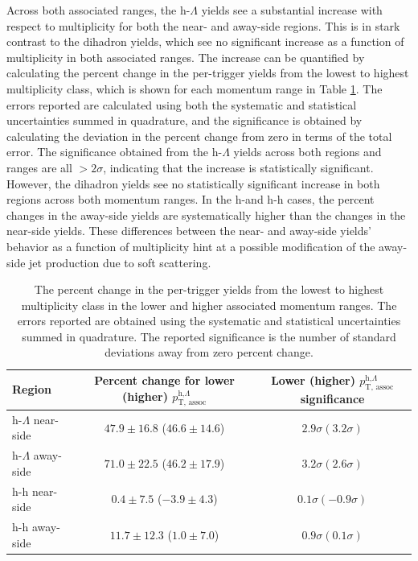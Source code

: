 Across both associated \pt ranges, the h-$\Lambda$ yields see a substantial increase with respect to multiplicity for both the near- and away-side regions. This is in stark contrast to the dihadron yields, which see no significant increase as a function of multiplicity in both associated \pt ranges. The increase can be quantified by calculating the percent change in the per-trigger yields from the lowest to highest multiplicity class, which is shown for each momentum range in Table \ref{tab:percent_increase}. The errors reported are calculated using both the systematic and statistical uncertainties summed in quadrature, and the significance is obtained by calculating the deviation in the percent change from zero in terms of the total error. The significance obtained from the h-$\Lambda$ yields across both regions and \pt ranges are all $>2\sigma$, indicating that the increase is statistically significant. However, the dihadron yields see no statistically significant increase in both regions across both momentum ranges. In the h-\lmb and h-h cases, the percent changes in the away-side yields are systematically higher than the changes in the near-side yields. These differences between the near- and away-side yields' behavior as a function of multiplicity hint at a possible modification of the away-side jet production due to soft scattering.

\begin{table}
\centering
\caption{The percent change in the per-trigger yields from the lowest to highest multiplicity class in the lower and higher associated momentum ranges. The errors reported are obtained using the systematic and statistical uncertainties summed in quadrature. The reported significance is the number of standard deviations away from zero percent change.}
\begin{tabular}{l c c}
\hline
Region & Percent change for lower (higher) $p_{\text{T, assoc}}^{\text{h,}\Lambda}$ & Lower (higher) $p_{\text{T, assoc}}^{\text{h,}\Lambda}$ significance \\
\hline
h-$\Lambda$ near-side &  $47.9 \pm 16.8$ ($46.6 \pm 14.6$) & $ 2.9\sigma (3.2\sigma) $\\ 
h-$\Lambda$ away-side &  $71.0 \pm 22.5$ ($46.2 \pm 17.9$) & $3.2\sigma (2.6\sigma)$ \\
h-h near-side &  $ 0.4 \pm 7.5$ ($-3.9 \pm 4.3$) & $0.1\sigma (-0.9\sigma)$ \\
h-h away-side &  $11.7 \pm 12.3$ ($1.0 \pm 7.0$) & $0.9\sigma (0.1\sigma)$ \\
\hline
\end{tabular}
\label{tab:percent_increase}
\end{table}

